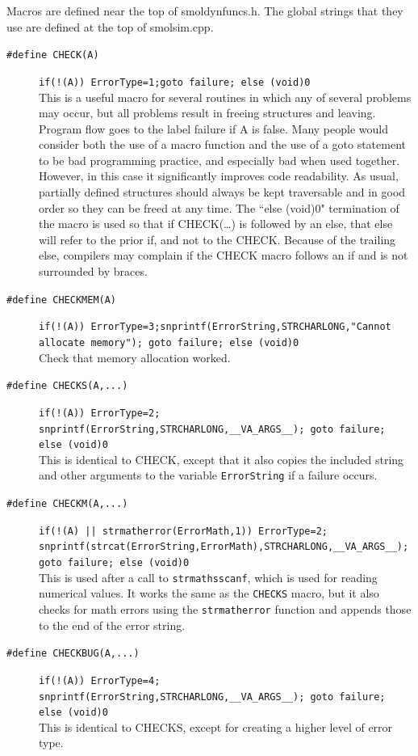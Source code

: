 \documentclass {scrbook}
\newcommand {\ttt} {\texttt}
\begin{document}
Macros are defined near the top of smoldynfuncs.h. The global strings that they use are defined at the top of smolsim.cpp.

\begin{description}
\item[\ttt{\#define CHECK(A)}]
\ttt{if(!(A)) {ErrorType=1;goto failure;} else (void)0}
\hfill \\
This is a useful macro for several routines in which any of several problems may occur, but all problems result in freeing structures and leaving. Program flow goes to the label failure if A is false. Many people would consider both the use of a macro function and the use of a goto statement to be bad programming practice, and especially bad when used together. However, in this case it significantly improves code readability. As usual, partially defined structures should always be kept traversable and in good order so they can be freed at any time. The ``else (void)0" termination of the macro is used so that if CHECK(\ldots) is followed by an else, that else will refer to the prior if, and not to the CHECK. Because of the trailing else, compilers may complain if the CHECK macro follows an if and is not surrounded by braces.

\item[\ttt{\#define CHECKMEM(A)}]
\ttt{if(!(A)) {ErrorType=3;snprintf(ErrorString,STRCHARLONG,"Cannot allocate memory"); goto failure;} else (void)0}
\hfill \\
Check that memory allocation worked.

\item[\ttt{\#define CHECKS(A,...)}]
\ttt{if(!(A)) {ErrorType=2; snprintf(ErrorString,STRCHARLONG,\_\_VA\_ARGS\_\_); goto failure;} else (void)0}
\hfill \\
This is identical to CHECK, except that it also copies the included string and other arguments to the variable \ttt{ErrorString} if a failure occurs.

\item[\ttt{\#define CHECKM(A,...)}]
\ttt{if(!(A) || strmatherror(ErrorMath,1)) {ErrorType=2; snprintf(strcat(ErrorString,ErrorMath),STRCHARLONG,\_\_VA\_ARGS\_\_); goto failure;} else (void)0}
\hfill \\
This is used after a call to \ttt{strmathsscanf}, which is used for reading numerical values. It works the same as the \ttt{CHECKS} macro, but it also checks for math errors using the \ttt{strmatherror} function and appends those to the end of the error string.

\item[\ttt{\#define CHECKBUG(A,...)}]
\ttt{if(!(A)) {ErrorType=4; snprintf(ErrorString,STRCHARLONG,\_\_VA\_ARGS\_\_); goto failure;} else (void)0}
\hfill \\
This is identical to CHECKS, except for creating a higher level of error type.


\end{description}
\end{document}
